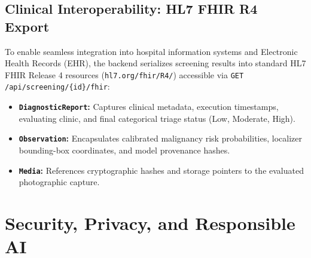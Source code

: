 \documentclass[11pt,a4paper]{report}
\newcommand{\artifact}[1]{\texttt{\footnotesize #1}}
\begin{document}
\section{Clinical Interoperability: HL7 FHIR R4 Export}
To enable seamless integration into hospital information systems and Electronic Health Records (EHR), the backend serializes screening results into standard HL7 FHIR Release 4 resources (\artifact{hl7.org/fhir/R4/}) accessible via \texttt{GET /api/screening/\{id\}/fhir}:
\begin{itemize}
  \item \textbf{\texttt{DiagnosticReport}:} Captures clinical metadata, execution timestamps, evaluating clinic, and final categorical triage status (Low, Moderate, High).
  \item \textbf{\texttt{Observation}:} Encapsulates calibrated malignancy risk probabilities, localizer bounding-box coordinates, and model provenance hashes.
  \item \textbf{\texttt{Media}:} References cryptographic hashes and storage pointers to the evaluated photographic capture.
\end{itemize}

\chapter{Security, Privacy, and Responsible AI}
\end{document}
